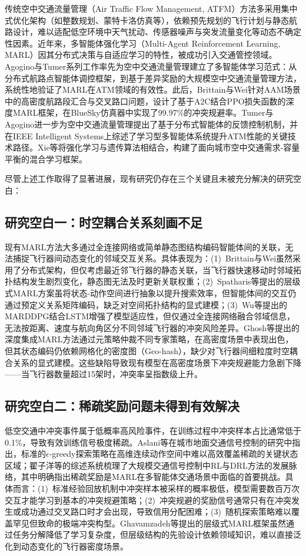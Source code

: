 \documentclass[12pt,a4paper,UTF8]{ctexart}
\begin{document}
传统空中交通流量管理（Air Traffic Flow Management, ATFM）方法多采用集中式优化架构（如整数规划、蒙特卡洛仿真等），依赖预先规划的飞行计划与静态航路设计，难以适配低空环境中天气扰动、传感器噪声与突发流量变化等动态不确定性因素。近年来，多智能体强化学习（Multi-Agent Reinforcement Learning, MARL）因其分布式决策与自适应学习的特性，被成功引入交通管控领域。Agogino与Tumer系列工作率先为空中交通流量管理建立了多智能体学习范式：从分布式航路点智能体调控框架\cite{ref1}，到基于差异奖励的大规模空中交通流量管理方法\cite{ref2}，系统性地验证了MARL在ATM领域的有效性。此后，Brittain与Wei针对AAM场景中的高密度航路段汇合与交叉路口问题，设计了基于A2C结合PPO损失函数的深度MARL框架，在BlueSky仿真器中实现了99.97\%的冲突规避率\cite{ref3}。Tumer与Agogino进一步为空中交通流量管理提出了基于分布式智能体的反馈控制机制\cite{ref4}，并在IEEE Intelligent Systems上综述了学习型多智能体系统提升ATM性能的关键技术路径\cite{ref5}。Xie等将强化学习与遗传算法相结合，构建了面向城市空中交通需求-容量平衡的混合学习框架\cite{ref6}。

尽管上述工作取得了显著进展，现有研究仍存在三个关键且未被充分解决的研究空白：

\subsection{研究空白一：时空耦合关系刻画不足}

现有MARL方法大多通过全连接网络或简单静态图结构编码智能体间的关联，无法捕捉飞行器间动态变化的邻域交互关系。具体表现为：(1)~Brittain与Wei虽然采用了分布式架构，但仅考虑最近邻飞行器的静态关联，当飞行器快速移动时邻域拓扑结构发生剧烈变化，静态图无法及时更新关联权重\cite{ref3}；(2)~Spatharis等提出的层级式MARL方案虽将状态-动作空间进行抽象以提升搜索效率，但智能体间的交互仍通过预定义关系矩阵编码，缺乏对空间拓扑结构的显式建模\cite{ref7}；(3)~Wu等提出的MARDDPG结合LSTM增强了模型适应性，但仅通过全连接网络融合邻域信息，无法按距离、速度与航向角区分不同邻域飞行器的冲突风险差异。Ghosh等提出的深度集成MARL方法通过元策略仲裁不同专家策略，在高密度场景中表现出色，但其状态编码仍依赖网格化的密度图（Geo-hash），缺少对飞行器间细粒度时空耦合关系的显式建模\cite{ref9}。这些缺陷导致现有模型在高密度场景下冲突规避能力急剧下降——当飞行器数量超过15架时，冲突率呈指数级上升。

\subsection{研究空白二：稀疏奖励问题未得到有效解决}

低空交通中冲突事件属于低概率高风险事件，在训练过程中冲突样本占比通常低于0.1\%，导致有效训练信号极度稀疏。Aslani等在城市地面交通信号控制的研究中指出，标准的$\epsilon$-greedy探索策略在高维连续动作空间中难以高效覆盖稀疏的关键状态区域\cite{ref10}；翟子洋等的综述系统梳理了大规模交通信号控制中RL与DRL方法的发展脉络，其中明确指出稀疏奖励是MARL在多智能体交通场景中面临的首要挑战\cite{ref11}。具体而言：(1)~标准经验回放机制中冲突样本被采样的概率极低，模型需要数百万次交互才能学习到基本的冲突规避策略；(2)~冲突规避的奖励信号通常只有在冲突发生或成功通过交叉路口时才会出现，导致信用分配困难；(3)~随机探索策略难以覆盖罕见但致命的极端冲突构型。Ghavamzadeh等提出的层级式MARL框架虽然通过任务分解降低了学习复杂度\cite{ref12}，但层级结构的先验设计依赖领域知识，难以直接泛化到动态变化的飞行器密度场景。
\end{document}
